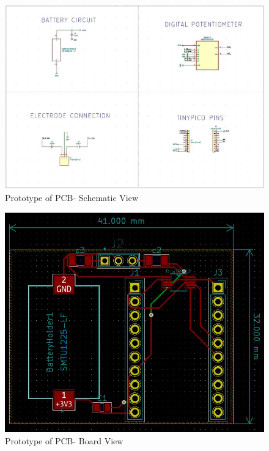 \documentclass{article}
\begin{document}
\begin{figure}[ht!]
\centering
\includegraphics[scale=0.35]{EESCHEMA.JPG}
\caption{Prototype of PCB- Schematic View}
\label{fig:schematic}
\end{figure}

\begin{figure}[ht!]
\centering
\includegraphics[scale=0.5]{myboard.JPG}
\caption{Prototype of PCB- Board View}
\label{fig:board}
\end{figure}
\end{document}
